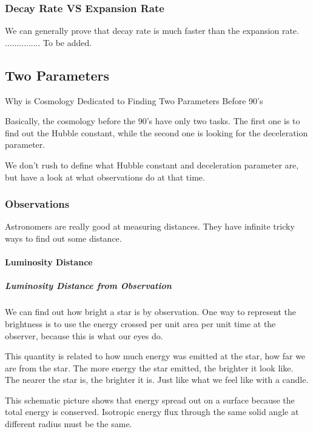 \documentclass[letterpaper,10pt,english]{sphinxmanual}
\begin{document}
{\subsubsection{Decay Rate VS Expansion Rate}
\label{Cosmology/cosmoIndex:decay-rate-vs-expansion-rate}
We can generally prove that decay rate is much faster than the expansion rate. ............... To be added.


\subsection{Two Parameters}
\label{Cosmology/cosmoIndex:two-parameters}
Why is Cosmology Dedicated to Finding Two Parameters Before 90's

Basically, the cosmology before the 90's have only two tasks. The first one is to find out the Hubble constant, while the second one is looking for the deceleration parameter.

We don't rush to define what Hubble constant and deceleration parameter are, but have a look at what observations do at that time.


\subsubsection{Observations}
\label{Cosmology/cosmoIndex:observations}
Astronomers are really good at measuring distances. They have infinite tricky ways to find out some distance.


\paragraph{Luminosity Distance}
\label{Cosmology/cosmoIndex:luminosity-distance}

\subparagraph{Luminosity Distance from Observation}
\label{Cosmology/cosmoIndex:luminosity-distance-from-observation}
We can find out how bright a star is by observation. One way to represent the brightness is to use the energy crossed per unit area per unit time at the observer, because this is what our eyes do.

This quantity is related to how much energy was emitted at the star, how far we are from the star. The more energy the star emitted, the brighter it look like. The nearer the star is, the brighter it is. Just like what we feel like with a candle.

This schematic picture shows that energy spread out on a surface because the total energy is conserved. Isotropic energy flux through the same solid angle at different radius must be the same.

}
\end{document}
